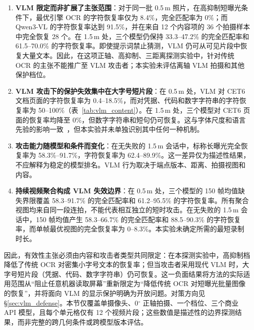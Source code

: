 \documentclass{ieeeaccess}
\begin{document}
\begin{enumerate}
\item \textbf{VLM 限定而非扩展了主张范围}：对于同一批 0.5\,m 照片，在高抑制短曝光条件下，最优引擎 OCR 的字符恢复率仅为 8.4\%，完全匹配率为 0\%；而 Qwen3-VL 的字符恢复率达到 91.5\%，并在来自 12 个内容项的 36 个拍摄样本中完全恢复 28 个。在 1.5\,m 处，三个模型仍保持 33.3--47.2\% 的完全匹配率和 61.5--70.0\% 的字符恢复率。即使提示词禁止猜测，VLM 仍可从可见片段中恢复大量文本。因此，在这项正轴、高抑制、三距离探测实验中，针对传统 OCR 的主张不能推广至 VLM 攻击者；本实验未评估离轴 VLM 拍摄和其他保护档位。

\item \textbf{VLM 攻击下的保护失效集中在大字号短片段}：在 0.5\,m 处，VLM 对 CET6 文档页面的字符恢复率为 0.4--18.5\%，而对凭据、代码和数字字符串的字符恢复率为 50--100\%（表~\ref{tab:vlm_content}）。在 1.5\,m 处，三个模型对 CET6 页面的恢复率均降至 0\%，但数字字符串和短句仍可恢复。这与字体尺度和语言先验的影响一致~\cite{b_shi2023,b_jiang2025}，但本实验并未单独识别其中任何一种机制。

\item \textbf{攻击能力随模型和条件而变化}：在无失败的 1.5\,m 会话中，标称长曝光完全恢复率为 58.3\%--91.7\%，字符恢复率为 62.4--89.9\%。这一差异仅为描述性结果，不应解释为稳定的模型排名。VLM 行为取决于端点版本、距离、拍摄视图和内容。

\item \textbf{持续视频聚合构成 VLM 失效边界}：在 0.5\,m 处，三个模型的 150 帧均值缺失界限覆盖 58.3--91.7\% 的完全匹配率和 61.2--95.5\% 的字符恢复率。所有聚合视图均来自同一段连拍，不能代表相互独立的短时攻击。在无失败的 1.5\,m 会话中，150 帧均值产生 58.3--66.7\% 的完全匹配率和 88.5--90.3\% 的字符恢复率，而单帧最优视图的完全恢复率为 0--8.3\%。本实验未确定所需的最短录制时长。
\end{enumerate}

因此，有效性主张必须由内容和攻击者类型共同限定：在本探测实验中，高抑制档降低了传统 OCR 对密集小字号文本的恢复率；但当攻击者采用现代 VLM 时，大字号短片段（凭据、代码、数字字符串）仍可恢复。这一负面结果将方法的实际适用范围从“阻止任意机器读取屏幕”重新限定为“降低传统 OCR 对短曝光批量图像的恢复”，并将面向 VLM 的显示保护明确为开放问题。对策方向见 \S\ref{sec:vlm_defense}。本节仅覆盖单摄像头、0$^{\circ}$ 正轴拍摄、一个档位、三个商业 API 模型，且每个单元格仅有 12 个视频片段；这些数值是描述性的边界探测结果，而非完整的跨几何条件或跨模型版本评估。
\end{document}
